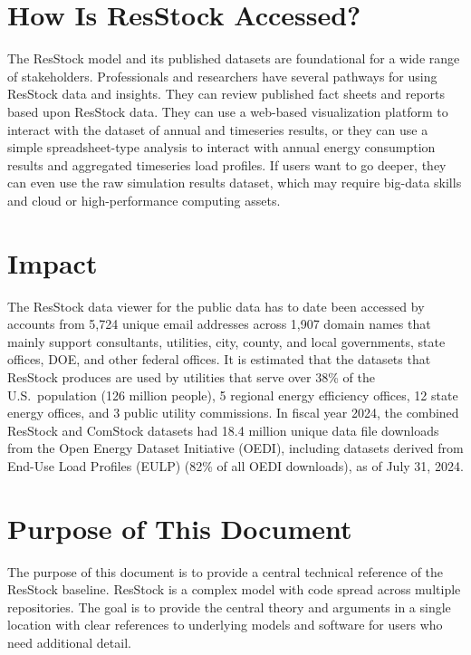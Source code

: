 \documentclass[]{nrel}
\begin{document}
\section*{How Is ResStock Accessed?}

The ResStock model and its published datasets are foundational for a wide range of stakeholders. Professionals and researchers have several pathways for using ResStock data and insights. They can review published fact sheets and reports based upon ResStock data. They can use a web-based visualization platform to interact with the dataset of annual and timeseries results, or they can use a simple spreadsheet-type analysis to interact with annual energy consumption results and aggregated timeseries load profiles. If users want to go deeper, they can even use the raw simulation results dataset, which may require big-data skills and cloud or high-performance computing assets. 

\section*{Impact}

The ResStock data viewer for the public data has to date been accessed by accounts from 5,724 unique email addresses across 1,907 domain names that mainly support consultants, utilities, city, county, and local governments, state offices, DOE, and other federal offices. It is estimated that the datasets that ResStock produces are used by utilities that serve over 38\% of the U.S.~population (126 million people), 5 regional energy efficiency offices, 12 state energy offices, and 3 public utility commissions. In fiscal year 2024, the combined ResStock and ComStock datasets had 18.4 million unique data file downloads from the Open Energy Dataset Initiative (OEDI), including datasets derived from End-Use Load Profiles (EULP) (82\% of all OEDI downloads), as of July 31, 2024.


\section*{Purpose of This Document}

The purpose of this document is to provide a central technical reference of the ResStock baseline. ResStock is a complex model with code spread across multiple repositories. The goal is to provide the central theory and arguments in a single location with clear references to underlying models and software for users who need additional detail.
\end{document}
